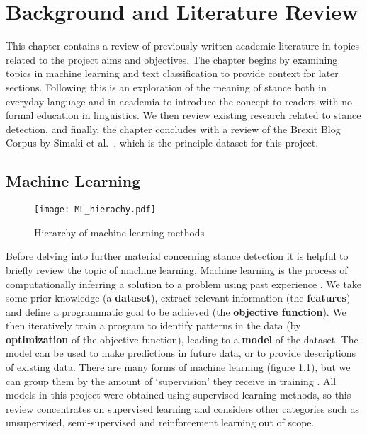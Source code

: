\documentclass[Dissertation.tex]{subfiles}
\begin{document}
\chapter{Background and Literature Review}
This chapter contains a review of previously written academic literature in topics related to the project aims and objectives. The chapter begins by examining topics in machine learning and text classification to provide context for later sections. Following this is an exploration of the meaning of stance both in everyday language and in academia to introduce the concept to readers with no formal education in linguistics. We then review existing research related to stance detection, and finally, the chapter concludes with a review of the Brexit Blog Corpus by Simaki et al.\ \cite{simakiAnnotatingSpeakerStance2017}, which is the principle dataset for this project.
 



\section{Machine Learning}


\begin{figure}
	\centering
	\texttt{[image: ML\_hierachy.pdf]}
	\caption{Hierarchy of machine learning methods}
	\label{mlHierachy}
\end{figure}

Before delving into further material concerning stance detection it is helpful to briefly review the topic of machine learning. Machine learning is the process of computationally inferring a solution to a problem using past experience \cite{alpaydinIntroductionMachineLearning2014}. We take some prior knowledge (a \textbf{dataset}), extract relevant information (the \textbf{features}) and define a programmatic goal to be achieved (the \textbf{objective function}). We then iteratively train a program to identify patterns in the data (by \textbf{optimization} of the objective function), leading to a\textbf{ model }of the dataset. The model can be used to make predictions in future data, or to provide descriptions of existing data\cite{alpaydinIntroductionMachineLearning2014}. There are many forms of machine learning (figure \ref{mlHierachy}), but we can group them by the amount of `supervision' they receive in training \cite{geronHandsonMachineLearning2017}. All models in this project were obtained using supervised learning methods, so this review concentrates on supervised learning and considers other categories such as unsupervised, semi-supervised and reinforcement learning out of scope.
\end{document}
